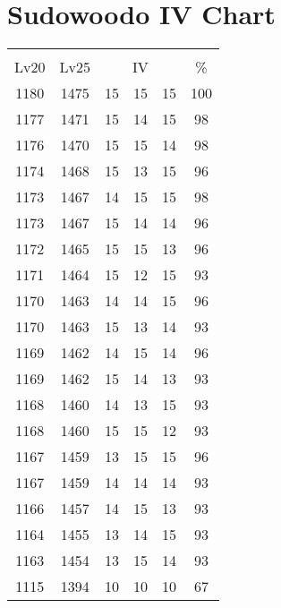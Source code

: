 \documentclass{article}%
\begin{document}
%
\normalsize%
\section{Sudowoodo IV Chart}%
\label{sec:Sudowoodo IV Chart}%
\renewcommand{\arraystretch}{1.5}%
\begin{tabular}{|c|c|c|c|c|c|}%
\hline%
\multicolumn{6}{|c|}{\textcolor{white}{ 
\linebreak{Sudowoodo}
}%
\cellcolor{black}}\\%
\multicolumn{1}{|c}{Lv20}&\multicolumn{1}{c|}{Lv25}&\multicolumn{3}{c|}{IV}&\multicolumn{1}{|c|}{\%}\\%
\hline%
\rowcolor{color100}%
1180&1475&15&15&15&100\\%
\hline%
\rowcolor{color98}%
1177&1471&15&14&15&98\\%
\hline%
\rowcolor{color98}%
1176&1470&15&15&14&98\\%
\hline%
\rowcolor{color96}%
1174&1468&15&13&15&96\\%
\hline%
\rowcolor{color98}%
1173&1467&14&15&15&98\\%
\hline%
\rowcolor{color96}%
1173&1467&15&14&14&96\\%
\hline%
\rowcolor{color96}%
1172&1465&15&15&13&96\\%
\hline%
\rowcolor{color93}%
1171&1464&15&12&15&93\\%
\hline%
\rowcolor{color96}%
1170&1463&14&14&15&96\\%
\hline%
\rowcolor{color93}%
1170&1463&15&13&14&93\\%
\hline%
\rowcolor{color96}%
1169&1462&14&15&14&96\\%
\hline%
\rowcolor{color93}%
1169&1462&15&14&13&93\\%
\hline%
\rowcolor{color93}%
1168&1460&14&13&15&93\\%
\hline%
\rowcolor{color93}%
1168&1460&15&15&12&93\\%
\hline%
\rowcolor{color96}%
1167&1459&13&15&15&96\\%
\hline%
\rowcolor{color93}%
1167&1459&14&14&14&93\\%
\hline%
\rowcolor{color93}%
1166&1457&14&15&13&93\\%
\hline%
\rowcolor{color93}%
1164&1455&13&14&15&93\\%
\hline%
\rowcolor{color93}%
1163&1454&13&15&14&93\\%
\hline%
\rowcolor{color91}%
1115&1394&10&10&10&67\\%
\end{tabular}

%
\end{document}
